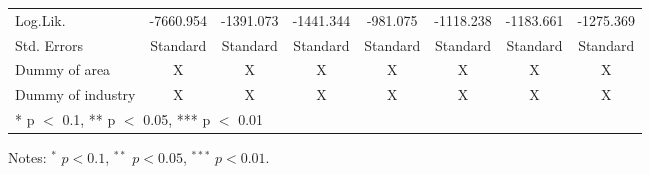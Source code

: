 \documentclass[
  11pt,
  a4paper,
]{article}
\begin{document}
\begin{table}[H]
{\begin{threeparttable}
\begin{tabular}[t]{lccccccc}
Log.Lik. & -7660.954 & -1391.073 & -1441.344 & -981.075 & -1118.238 & -1183.661 & -1275.369\\
Std. Errors & Standard & Standard & Standard & Standard & Standard & Standard & Standard\\
Dummy of area & X & X & X & X & X & X & X\\
Dummy of industry & X & X & X & X & X & X & X\\
\bottomrule
\multicolumn{8}{l}{\rule{0pt}{1em}* p $<$ 0.1, ** p $<$ 0.05, *** p $<$ 0.01}\\
\end{tabular}
\begin{tablenotes}
\item Notes: $^{*}$ $p < 0.1$, $^{**}$ $p < 0.05$, $^{***}$ $p < 0.01$.
\end{tablenotes}
\end{threeparttable}}
\end{table}
\end{document}
